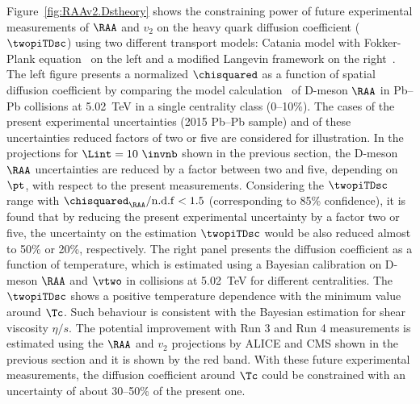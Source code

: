 Figure~\ref{fig:RAAv2.Dstheory} shows the constraining power of future experimental measurements of  $\RAA$ and $v_2$ on the heavy quark diffusion coefficient ($\twopiTDsc$) using two different transport models: Catania model with Fokker-Plank equation~\cite{Das:2015ana,Das:2013kea} on the left and a modified Langevin framework on the right~\cite{PhysRevC.97.014907}. The left figure presents a normalized $\chisquared$ as a function of spatial diffusion coefficient by comparing the model calculation~\cite{Das:2015ana,Das:2013kea} of D-meson $\RAA$ in Pb--Pb collisions at 5.02~TeV in a single centrality class (0--10\%). 
The cases of the present experimental uncertainties (2015 Pb--Pb sample) and of these uncertainties reduced factors of two or five are considered for illustration. In the projections for $\Lint=10~\invnb$ shown in the previous section, the D-meson $\RAA$ uncertainties are reduced by a factor between two and five, depending on $\pt$, with respect to the present measurements.
Considering the $\twopiTDsc$ range with $\chisquared_{\RAA}/{\rm n.d.f}<1.5$ (corresponding to 85\% confidence), it is found that by reducing the present experimental uncertainty by a factor two or five, the uncertainty on the estimation $\twopiTDsc$ would be also reduced almost to 50$\%$ or 20\%, respectively. The right panel presents the diffusion coefficient as a function of temperature, which is estimated using a Bayesian calibration on D-meson $\RAA$ and $\vtwo$ in \PbPb collisions at 5.02~TeV for different centralities. The $\twopiTDsc$ shows a positive temperature dependence with the minimum value around $\Tc$. Such behaviour is consistent with the Bayesian estimation for shear viscosity $\eta/s$. The potential improvement with Run 3 and Run 4 measurements is estimated using the $\RAA$ and $v_2$ projections by ALICE and CMS shown in the previous section and it is shown by the red band. With these future experimental measurements, the diffusion coefficient around $\Tc$ could be constrained with an uncertainty of about 30--50\% of the present one. 



